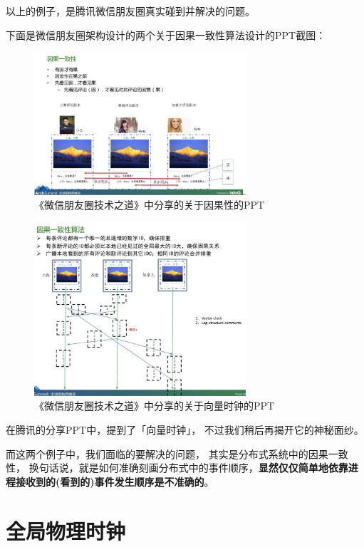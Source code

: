 \documentclass[cn,11pt,chinese]{elegantbook}
\begin{document}
以上的例子，是腾讯微信朋友圈真实碰到并解决的问题。

下面是微信朋友圈架构设计的两个关于因果一致性算法设计的PPT截图：

\begin{figure}
    \centering
    \includegraphics[width=0.7\textwidth]{images/appendix-a-03.jpeg}
    \caption{《微信朋友圈技术之道》中分享的关于因果性的PPT}
\end{figure}

\begin{figure}
    \centering
    \includegraphics[width=0.7\textwidth]{images/appendix-a-04.jpeg}
    \caption{《微信朋友圈技术之道》中分享的关于向量时钟的PPT}
\end{figure}

在腾讯的分享PPT中，提到了「向量时钟」， 不过我们稍后再揭开它的神秘面纱。

而这两个例子中，我们面临的要解决的问题， 其实是分布式系统中的因果一致性， 换句话说，就是如何准确刻画分布式中的事件顺序，\textbf{显然仅仅简单地依靠进程接收到的(看到的)事件发生顺序是不准确的}。

\section{全局物理时钟}
\end{document}
